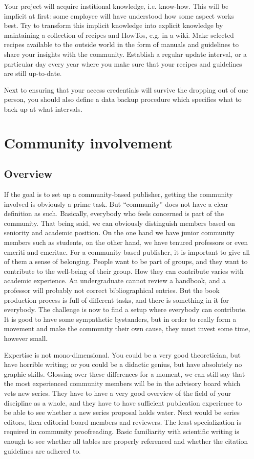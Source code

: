 \documentclass[nonflat,modfonts,output=book] {langsci/langscibook}
\begin{document}
Your project will acquire institional knowledge, i.e. know-how. This will be implicit at first: some employee will have understood how some aspect works best. Try to transform this implicit knowledge into explicit knowledge by maintaining a collection of recipes and HowTos, e.g. in  a wiki. Make selected recipes available to the outside world in the form of manuals and guidelines to share your insights with the community. Establish a regular update interval, or a particular day every year where you make sure that your recipes and guidelines are still up-to-date. 

Next to ensuring that your access credentials will survive the dropping out of one person, you should also define a data backup procedure which specifies what to back up at what intervals. 


\section{Community involvement}\label{sec:community}
\subsection{Overview}
If the goal is to set up a community-based publisher, getting the community involved is obviously a prime task. But ``community'' does not have a clear definition as such. Basically, everybody who feels concerned is part of the community. That being said, we can obviously distinguish members based on seniority and academic position. On the one hand we have junior community members such as students, on the other hand, we have tenured professors or even emeriti and emeritae. For a community-based publisher, it is important to give all of them a sense of belonging.  People want to be part of groups, and they want to contribute to the well-being of their group. How they can contribute varies with academic experience. An undergraduate cannot review a handbook, and a professor will probably not correct bibliographical entries. But the book production process is full of different tasks, and there is something in it for everybody. The challenge is now to find a setup where everybody can contribute. It is good to have some sympathetic bystanders, but in order to really form a movement and make the community their own cause, they must invest some time, however small. 

Expertise is not mono-dimensional. You could be a very good theoretician, but have horrible writing; or you could be a didactic genius, but have absolutely no graphic skills. Glossing over these differences for a moment, we can still say that the most experienced community members will be in the advisory board which vets new series. They have to have a very good overview of the field of your discipline as a whole, and they have to have sufficient publication experience to be able to see whether a new series proposal holds water. Next would be series editors, then editorial board members and reviewers. The least specialization is required in community proofreading. Basic familiarity with scientific writing is enough to see whether all tables are properly referenced and whether the citation guidelines are adhered to. 
\end{document}
